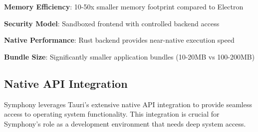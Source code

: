 \begin{infobox}[title=Tauri Architecture Benefits]
\begin{compactlist}
    \item \textbf{Memory Efficiency}: 10-50x smaller memory footprint compared to Electron
    \item \textbf{Security Model}: Sandboxed frontend with controlled backend access
    \item \textbf{Native Performance}: Rust backend provides near-native execution speed
    \item \textbf{Bundle Size}: Significantly smaller application bundles (10-20MB vs 100-200MB)
\end{compactlist}
\end{infobox}

\subsection*{Native API Integration}

Symphony leverages Tauri's extensive native API integration to provide seamless access to operating system functionality. This integration is crucial for Symphony's role as a development environment that needs deep system access.

